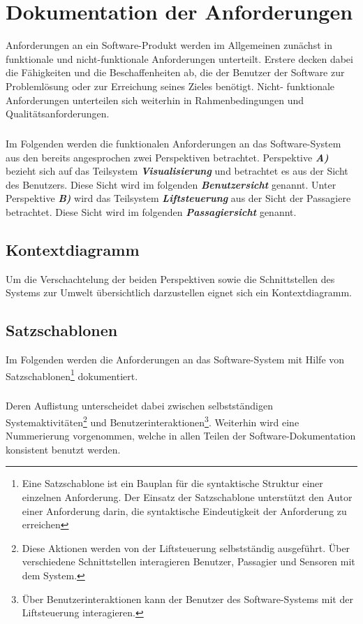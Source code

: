 \chapter{Dokumentation der Anforderungen}
Anforderungen an ein Software-Produkt werden im Allgemeinen zunächst in funktionale und nicht-funktionale Anforderungen unterteilt. Erstere decken dabei die Fähigkeiten und die Beschaffenheiten ab, die der Benutzer der Software zur Problemlösung oder zur Erreichung seines Zieles benötigt. Nicht- funktionale Anforderungen unterteilen sich weiterhin in Rahmenbedingungen und Qualitätsanforderungen.

\paragraph{}
Im Folgenden werden die funktionalen Anforderungen an das Software-System aus den bereits angesprochen zwei Perspektiven betrachtet. Perspektive \textit{\textbf{A)}} bezieht sich auf das Teilsystem \textit{\textbf{Visualisierung}} und betrachtet es aus der Sicht des Benutzers. Diese Sicht wird im folgenden \textit{\textbf{Benutzersicht}} genannt. Unter Perspektive \textit{\textbf{B)}} wird das Teilsystem \textit{\textbf{Liftsteuerung}} aus der Sicht der Passagiere betrachtet. Diese Sicht wird im folgenden \textit{\textbf{Passagiersicht}} genannt.

\newpage
\section{Kontextdiagramm}
Um die Verschachtelung der beiden Perspektiven sowie die Schnittstellen des Systems zur Umwelt übersichtlich darzustellen eignet sich ein Kontextdiagramm.

\newpage
\section{Satzschablonen}
Im Folgenden werden die Anforderungen an das Software-System mit Hilfe von Satzschablonen\footnote{Eine Satzschablone ist ein Bauplan für die syntaktische Struktur einer einzelnen Anforderung. Der Einsatz der Satzschablone unterstützt den Autor einer Anforderung darin, die syntaktische Eindeutigkeit der Anforderung zu erreichen} dokumentiert.

\paragraph{}
Deren Auflistung unterscheidet dabei zwischen selbstständigen Systemaktivitäten\footnote{Diese Aktionen werden von der Liftsteuerung selbstständig ausgeführt. Über verschiedene Schnittstellen interagieren Benutzer, Passagier und Sensoren mit dem System.} und Benutzerinteraktionen\footnote{Über Benutzerinteraktionen kann der Benutzer des Software-Systems mit der Liftsteuerung interagieren.}. Weiterhin wird eine Nummerierung vorgenommen, welche in allen Teilen der Software-Dokumentation konsistent benutzt werden.


